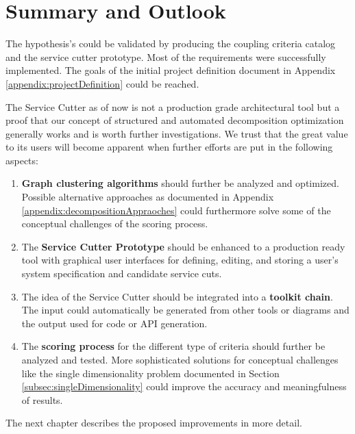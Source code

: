 \section{Summary and Outlook}

The hypothesis's could be validated by producing the coupling criteria catalog and the service cutter prototype. Most of the requirements were successfully implemented. The goals of the initial project definition document in Appendix \ref{appendix:projectDefinition} could be reached.

The Service Cutter as of now is not a production grade architectural tool but a proof that our concept of structured and automated decomposition optimization generally works and is worth further investigations. We trust that the great value to its users will become apparent when further efforts are put in the following aspects:

\begin{enumerate}
	\item \textbf{Graph clustering algorithms} should further be analyzed and optimized. Possible alternative approaches as documented in Appendix \ref{appendix:decompositionAppraoches} could furthermore solve some of the conceptual challenges of the scoring process.
	\item The \textbf{Service Cutter Prototype} should be enhanced to a production ready tool with graphical user interfaces for defining, editing, and storing a user's system specification and candidate service cuts. 
	\item The idea of the Service Cutter should be integrated into a \textbf{toolkit chain}. The input could automatically be generated from other tools or diagrams and the output used for code or \gls{API} generation.
	\item The \textbf{scoring process} for the different type of criteria should further be analyzed and tested. More sophisticated solutions for conceptual challenges like the single dimensionality problem documented in Section \ref{subsec:singleDimensionality} could improve the accuracy and meaningfulness of results. 
\end{enumerate}

\bigskip

The next chapter describes the proposed improvements in more detail.
